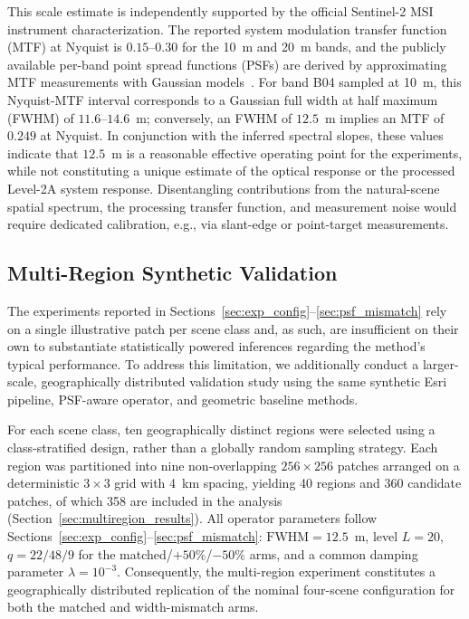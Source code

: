 \documentclass[journal]{IEEEtran}
\newcommand{\psf}{PSF\xspace}
\begin{document}
This scale estimate is independently supported by the official Sentinel-2 MSI instrument characterization. The reported system modulation transfer function (MTF) at Nyquist is $0.15$--$0.30$ for the 10~m and 20~m bands, and the publicly available per-band point spread functions (PSFs) are derived by approximating MTF measurements with Gaussian models~\cite{esa_s2_mtf_technical_guide}. For band B04 sampled at 10~m, this Nyquist-MTF interval corresponds to a Gaussian full width at half maximum (FWHM) of $11.6$--$14.6$~m; conversely, an FWHM of $12.5$~m implies an MTF of $0.249$ at Nyquist. In conjunction with the inferred spectral slopes, these values indicate that $12.5$~m is a reasonable effective operating point for the experiments, while not constituting a unique estimate of the optical response or the processed Level-2A system response. Disentangling contributions from the natural-scene spatial spectrum, the processing transfer function, and measurement noise would require dedicated calibration, e.g., via slant-edge or point-target measurements.

\subsection{Multi-Region Synthetic Validation}
\label{sec:multiregion}

The experiments reported in Sections~\ref{sec:exp_config}--\ref{sec:psf_mismatch} rely on a single illustrative patch per scene class and, as such, are insufficient on their own to substantiate statistically powered inferences regarding the method’s typical performance. To address this limitation, we additionally conduct a larger-scale, geographically distributed validation study using the same synthetic Esri pipeline, \psf-aware operator, and geometric baseline methods.

For each scene class, ten geographically distinct regions were selected using a class-stratified design, rather than a globally random sampling strategy. Each region was partitioned into nine non-overlapping $256\times256$ patches arranged on a deterministic $3\times3$ grid with 4~km spacing, yielding 40 regions and 360 candidate patches, of which 358 are included in the analysis (Section~\ref{sec:multiregion_results}). All operator parameters follow Sections~\ref{sec:exp_config}--\ref{sec:psf_mismatch}: $\mathrm{FWHM}=12.5$~m, level $L=20$, $q=22/48/9$ for the matched/$+50\%$/$-50\%$ arms, and a common damping parameter $\lambda=10^{-3}$. Consequently, the multi-region experiment constitutes a geographically distributed replication of the nominal four-scene configuration for both the matched and width-mismatch arms.
\end{document}
